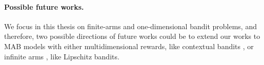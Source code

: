 \paragraph{Possible future works.}
%
We focus in this thesis on finite-arms and one-dimensional bandit problems,
and therefore, two possible directions of future works could be to extend our works
to MAB models with either multidimensional rewards, like contextual bandits \cite{Li10,Luo18,ChenLeeLuoWei2019}, or infinite arms \cite{valko2016bandits,Combes17}, like Lipschitz bandits.








